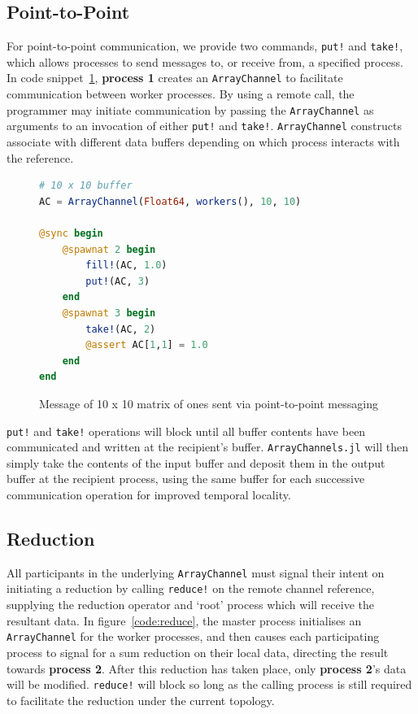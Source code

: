\documentclass{juliacon}
\begin{document}
\subsection{Point-to-Point}
\label{sec:p2p}

For point-to-point communication, we provide two commands, \texttt{put!}
and \texttt{take!}, which allows processes to send messages to, or receive
from, a specified process. In code snippet~\ref{code:put-take}, \textbf{process
1} creates an \texttt{ArrayChannel} to facilitate communication between
worker processes. By using a remote call, the programmer may initiate
communication by passing the \texttt{ArrayChannel} as arguments to an invocation of either
\texttt{put!} and \texttt{take!}. \texttt{ArrayChannel} constructs associate with different
data buffers depending on which process interacts with the reference.

\begin{figure}[htb]
	\begin{lstlisting}[language=Julia]
# 10 x 10 buffer
AC = ArrayChannel(Float64, workers(), 10, 10)

@sync begin
	@spawnat 2 begin
		fill!(AC, 1.0)
		put!(AC, 3)
	end
	@spawnat 3 begin
		take!(AC, 2)
		@assert AC[1,1] = 1.0
	end
end
	\end{lstlisting}
	\caption{Message of 10 x 10 matrix of ones sent via point-to-point messaging}
	\label{code:put-take}
\end{figure}

\texttt{put!} and \texttt{take!} operations will block until all buffer
contents have been communicated and written at the recipient's buffer.
\texttt{ArrayChannels.jl} will then
simply take the contents of the input buffer and deposit them in the
output buffer at the recipient process, using the same buffer for each
successive communication operation for improved temporal locality.

\subsection{Reduction}
\label{sec:reduce}

All participants in the underlying \texttt{ArrayChannel} must signal
their intent on initiating a reduction by calling \texttt{reduce!} on
the remote channel reference, supplying the reduction operator and
`root' process which will receive the resultant data. In figure~\ref{code:reduce}, the master process initialises an
\texttt{ArrayChannel} for the worker processes, and then causes each
participating process to signal for a sum reduction on their local data,
directing the result towards \textbf{process 2}. After this reduction has taken
place, only \textbf{process 2}'s data will be modified. \texttt{reduce!} will
block so long as the calling process is still required to facilitate the
reduction under the current topology.
\end{document}

